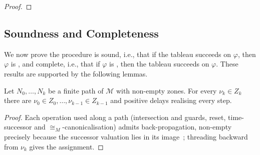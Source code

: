 \begin{proof}
%
%
\end{proof}










\subsection{Soundness and Completeness}\label{ss:sound}

We now prove the procedure is sound, i.e., that if the tableau succeeds on $\varphi$, then $\varphi$ is \SAT, and complete, i.e., that if $\varphi$ is \SAT, then the tableau succeeds on $\varphi$. These results are supported by the following lemmas. 

%
%

\begin{lemma}\label{lem:feasible}
Let $N_0,\dots,N_k$ be a finite path of $\mathcal{M}$ with non-empty zones. For every
$\nu_k\in Z_k$ there are $\nu_0\in Z_0,\dots,\nu_{k-1}\in Z_{k-1}$ and positive delays
realising every step.
\end{lemma}
\begin{proof}
Each operation used along a path (intersection and guards,
reset, time-successor and
$\cong_M$-canonicalisation) admits back-propagation, non-empty
precisely because the successor valuation lies in its image~\cite{Bouyer05TimedAutomata}; threading
backward from $\nu_k$ gives the assignment.
\end{proof}

